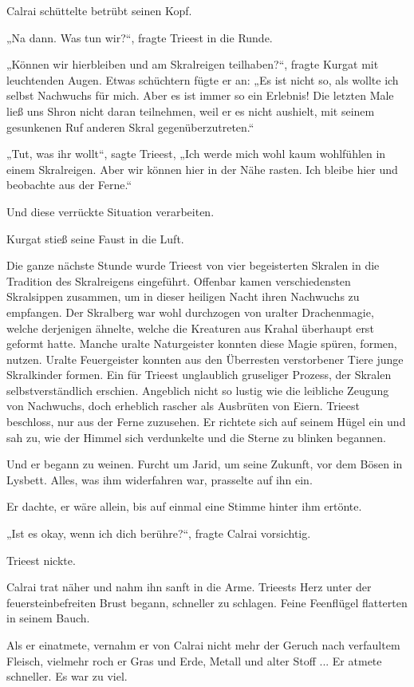 Calrai schüttelte betrübt seinen Kopf.

„Na dann. Was tun wir?“, fragte Trieest in die Runde.

„Können wir hierbleiben und am Skralreigen teilhaben?“, fragte Kurgat mit leuchtenden Augen. Etwas schüchtern fügte er an: „Es ist nicht so, als wollte ich selbst Nachwuchs für mich. Aber es ist immer so ein Erlebnis! Die letzten Male ließ uns Shron nicht daran teilnehmen, weil er es nicht aushielt, mit seinem gesunkenen Ruf anderen Skral gegenüberzutreten.“

„Tut, was ihr wollt“, sagte Trieest, „Ich werde mich wohl kaum wohlfühlen in einem Skralreigen. Aber wir können hier in der Nähe rasten. Ich bleibe hier und beobachte aus der Ferne.“

Und diese verrückte Situation verarbeiten.

Kurgat stieß seine Faust in die Luft.

Die ganze nächste Stunde wurde Trieest von vier begeisterten Skralen in die Tradition des Skralreigens eingeführt. Offenbar kamen verschiedensten Skralsippen zusammen, um in dieser heiligen Nacht ihren Nachwuchs zu empfangen. Der Skralberg war wohl durchzogen von uralter Drachenmagie, welche derjenigen ähnelte, welche die Kreaturen aus Krahal überhaupt erst geformt hatte. Manche uralte Naturgeister konnten diese Magie spüren, formen, nutzen. Uralte Feuergeister konnten aus den Überresten verstorbener Tiere junge Skralkinder formen. Ein für Trieest unglaublich gruseliger Prozess, der Skralen selbstverständlich erschien. Angeblich nicht so lustig wie die leibliche Zeugung von Nachwuchs, doch erheblich rascher als Ausbrüten von Eiern. Trieest beschloss, nur aus der Ferne zuzusehen. Er richtete sich auf seinem Hügel ein und sah zu, wie der Himmel sich verdunkelte und die Sterne zu blinken begannen.

Und er begann zu weinen. Furcht um Jarid, um seine Zukunft, vor dem Bösen in Lysbett. Alles, was ihm widerfahren war, prasselte auf ihn ein.

Er dachte, er wäre allein, bis auf einmal eine Stimme hinter ihm ertönte.

„Ist es okay, wenn ich dich berühre?“, fragte Calrai vorsichtig.

Trieest nickte.

Calrai trat näher und nahm ihn sanft in die Arme. Trieests Herz unter der feuersteinbefreiten Brust begann, schneller zu schlagen. Feine Feenflügel flatterten in seinem Bauch.

Als er einatmete, vernahm er von Calrai nicht mehr der Geruch nach verfaultem Fleisch, vielmehr roch er Gras und Erde, Metall und alter Stoff ... Er atmete schneller. Es war zu viel.

